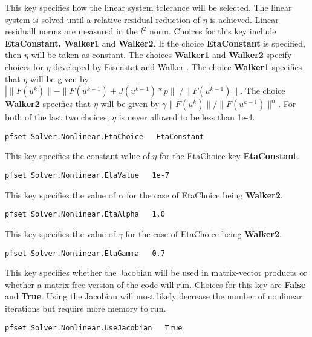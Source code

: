 {This key specifies how the linear system tolerance will be selected.  
The linear system is solved until a relative residual reduction of $\eta$ 
is achieved.  Linear residuall norms are measured in the $l^2$ norm.
Choices for this key include {\bf EtaConstant, Walker1} and 
{\bf Walker2}.  If the choice {\bf EtaConstant} is specified, then $\eta$ will
be taken as constant.  The choices {\bf Walker1} and {\bf Walker2} specify
choices for $\eta$ developed by Eisenstat and Walker \cite{EW96}.  The choice
{\bf Walker1} specifies that $\eta$ will be given by
$| \|F(u^k)\| - \|F(u^{k-1}) + J(u^{k-1})*p \|  |  / \|F(u^{k-1})\|$. The
choice {\bf Walker2} specifies that $\eta$ will be given by
$\gamma \|F(u^k)\| / \|F(u^{k-1})\|^{\alpha}$.  For both of the last two
choices, $\eta$ is never allowed to be less than 1e-4.
}
\begin{display}\begin{verbatim}
pfset Solver.Nonlinear.EtaChoice   EtaConstant
\end{verbatim}\end{display}


{This key specifies the constant value of $\eta$ for the EtaChoice key
{\bf EtaConstant}.
}
\begin{display}\begin{verbatim}
pfset Solver.Nonlinear.EtaValue   1e-7
\end{verbatim}\end{display}

{This key specifies the value of $\alpha$ for the case of EtaChoice being 
{\bf Walker2}. 
}
\begin{display}\begin{verbatim}
pfset Solver.Nonlinear.EtaAlpha   1.0
\end{verbatim}\end{display}

{This key specifies the value of $\gamma$ for the case of EtaChoice being
{\bf Walker2}.
}
\begin{display}\begin{verbatim}
pfset Solver.Nonlinear.EtaGamma   0.7
\end{verbatim}\end{display}

{This key specifies whether the Jacobian will be used in matrix-vector products
or whether a matrix-free version of the code will run.  Choices for this key 
are {\bf False} and {\bf True}.
Using the Jacobian will most likely decrease the number of nonlinear iterations
but require more memory to run.
}
\begin{display}\begin{verbatim}
pfset Solver.Nonlinear.UseJacobian   True
\end{verbatim}\end{display}

